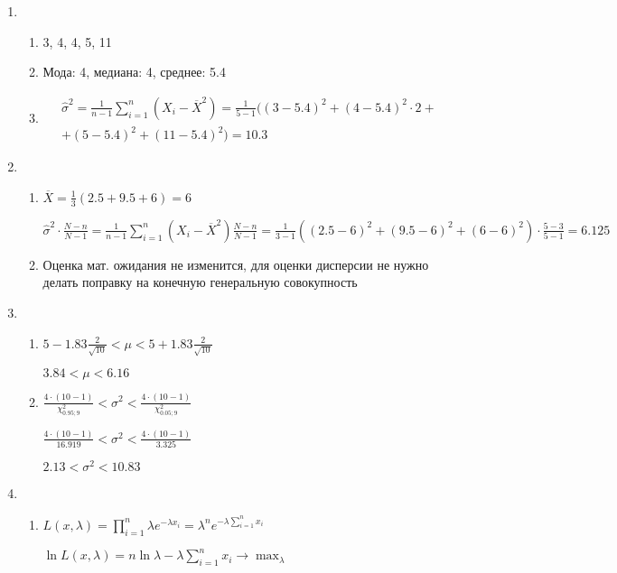 \begin{enumerate}
\item
\begin{enumerate}
\item 3, 4, 4, 5, 11
\item Мода: 4, медиана: 4, среднее: 5.4
\item
\begin{multline*}
\hat{\sigma}^2 = \frac{1}{n-1} \sum_{i=1}^{n} \left(X_i - \overline{X}^2 \right) = \frac{1}{5-1} ( (3-5.4)^2 + (4-5.4)^2 \cdot 2 +  \\
+ (5-5.4)^2 + (11-5.4)^2 ) = 10.3
\end{multline*}
\end{enumerate}

\item
\begin{enumerate}
\item $\overline{X} = \frac{1}{3} (2.5 + 9.5 + 6) = 6$

$\hat{\sigma}^2 \cdot \frac{N-n}{N-1} = \frac{1}{n-1} \sum_{i=1}^{n} \left(X_i - \overline{X}^2 \right) \frac{N-n}{N-1} = \frac{1}{3-1} ( (2.5-6)^2 + (9.5-6)^2 + (6-6)^2 ) \cdot \frac{5-3}{5-1} = 6.125$

\item Оценка мат. ожидания не изменится, для оценки дисперсии не нужно делать поправку на конечную генеральную совокупность
\end{enumerate}

\item
\begin{enumerate}
\item $5 - 1.83 \frac{2}{\sqrt{10}} < \mu < 5 + 1.83 \frac{2}{\sqrt{10}}$

$ 3.84 < \mu < 6.16$
\item $\frac{4\cdot(10-1)}{\chi^2_{0.95; 9}} < \sigma^2 < \frac{4\cdot(10-1)}{\chi^2_{0.05; 9}}  $

$\frac{4\cdot(10-1)}{16.919} < \sigma^2 < \frac{4\cdot(10-1)}{3.325}  $

$2.13 < \sigma^2 < 10.83$
\end{enumerate}

\item
\begin{enumerate}
\item $L(x, \lambda) = \prod_{i=1}^n \lambda e^{-\lambda x_i} = \lambda^n e^{-\lambda \sum_{i=1}^n x_i} $

$\ln L(x, \lambda) = n \ln \lambda - \lambda \sum_{i=1}^n x_i \to \max_\lambda $


\end{enumerate}
\end{enumerate}
